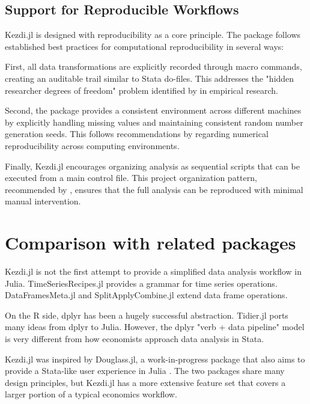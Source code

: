 \documentclass{juliacon}
\begin{document}
\subsection{Support for Reproducible Workflows}

Kezdi.jl is designed with reproducibility as a core principle. The package follows established best practices for computational reproducibility \citep{krafczyk2021learning} in several ways:

First, all data transformations are explicitly recorded through macro commands, creating an auditable trail similar to Stata do-files. This addresses the "hidden researcher degrees of freedom" problem identified by \citet{huntington2021influence} in empirical research.

Second, the package provides a consistent environment across different machines by explicitly handling missing values and maintaining consistent random number generation seeds. This follows recommendations by \citet{mccullough1999numerical} regarding numerical reproducibility across computing environments.

Finally, Kezdi.jl encourages organizing analysis as sequential scripts that can be executed from a main control file. This project organization pattern, recommended by \citet{koren2024ten}, ensures that the full analysis can be reproduced with minimal manual intervention.

\section{Comparison with related packages}

Kezdi.jl is not the first attempt to provide a simplified data analysis workflow in Julia. TimeSeriesRecipes.jl \citep{TimeSeriesRecipes2022} provides a grammar for time series operations. DataFramesMeta.jl \citep{DataFramesMeta2023} and SplitApplyCombine.jl \citep{SplitApplyCombine2023} extend data frame operations.

On the R side, dplyr \citep{dplyr2023} has been a hugely successful abstraction. Tidier.jl \citep{tidier2022} ports many ideas from dplyr to Julia. However, the dplyr "verb + data pipeline" model is very different from how economists approach data analysis in Stata.

Kezdi.jl was inspired by Douglass.jl, a work-in-progress package that also aims to provide a Stata-like user experience in Julia \citep{Douglass.jl2023}. The two packages share many design principles, but Kezdi.jl has a more extensive feature set that covers a larger portion of a typical economics workflow.
\end{document}
